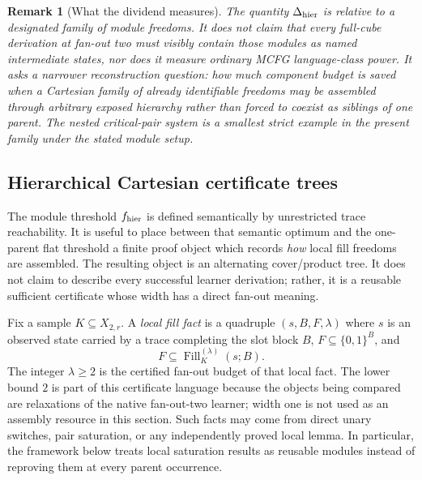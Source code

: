 \documentclass[11pt]{article}
\newtheorem{remark}[definition]{Remark}
\begin{document}
\begin{remark}[What the dividend measures]
The quantity $\Delta_{\rm hier}$ is relative to a designated family of module
freedoms.  It does not claim that every full-cube derivation at fan-out two
must visibly contain those modules as named intermediate states, nor does it
measure ordinary MCFG language-class power.  It asks a narrower reconstruction
question: how much component budget is saved when a Cartesian family of
already identifiable freedoms may be assembled through arbitrary exposed
hierarchy rather than forced to coexist as siblings of one parent.  The nested
critical-pair system is a smallest strict example in the present family under the stated module setup.
\end{remark}

\subsection{Hierarchical Cartesian certificate trees}
\label{subsec:cartesian-certificate-trees}

The module threshold $f_{\rm hier}$ is defined semantically by unrestricted
trace reachability.  It is useful to place between that semantic optimum and
the one-parent flat threshold a finite proof object which records \emph{how}
local fill freedoms are assembled.  The resulting object is an alternating
cover/product tree.  It does not claim to describe every successful learner
derivation; rather, it is a reusable sufficient certificate whose width has a
direct fan-out meaning.

Fix a sample $K\subseteq X_{2,r}$.  A \emph{local fill fact} is a quadruple
$(s,B,F,\lambda)$ where $s$ is an observed state carried by a trace completing
the slot block $B$, $F\subseteq\{0,1\}^{B}$, and
\[
  F\subseteq \operatorname{Fill}^{(\lambda)}_K(s;B).
\]
The integer $\lambda\ge2$ is the certified fan-out budget of that local fact.
The lower bound $2$ is part of this certificate language because the objects
being compared are relaxations of the native fan-out-two learner; width one is
not used as an assembly resource in this section.  Such
facts may come from direct unary switches, pair saturation, or any independently
proved local lemma.  In particular, the framework below treats local
saturation results as reusable modules instead of reproving them at every
parent occurrence.
\end{document}
